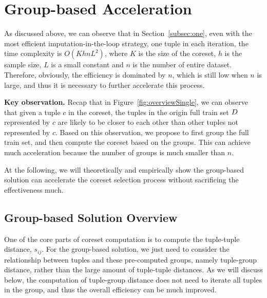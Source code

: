

\section{Group-based Acceleration}
\label{sec:group}

As discussed above, we can observe that in Section~\ref{subsec:one}, even with the most efficient imputation-in-the-loop  strategy, \ie  one tuple in  each iteration, the time complexity is  $O(KhnL^2)$, where $K$ is the size of the coreset, $h$ is the sample size, $L$ is a small constant and $n$ is the number of entire dataset. Therefore, obviously, the efficiency is dominated by $n$, which is still low when $n$ is large, and thus it  is necessary to further accelerate this process.

\noindent \textbf{Key observation.}   Recap that in Figure~\ref{fig:overviewSingle}, we can observe that  given a tuple $c$ in the coreset, the tuples in the origin full train set $D$ represented by $c$ are likely to be  closer to each other than other tuples not represented by $c$.
Based on this observation, we propose to first group the full train set, and then compute the coreset based on the groups. This can achieve much acceleration because the number of groups is much smaller than $n$. 

At the following, we will theoretically and empirically show the group-based solution can accelerate the coreset selection process without sacrificing the effectiveness much.


\subsection{Group-based Solution Overview}


One of the core parts of coreset computation is to compute the tuple-tuple distance, \ie $s_{ij}$. For the group-based solution, we just need to consider the relationship between tuples and these pre-computed groups, namely tuple-group distance, rather than the large amount of tuple-tuple distances. As we will discuss below, the computation of tuple-group distance does not need to iterate all tuples in the group, and thus  the overall efficiency can be much improved. 

